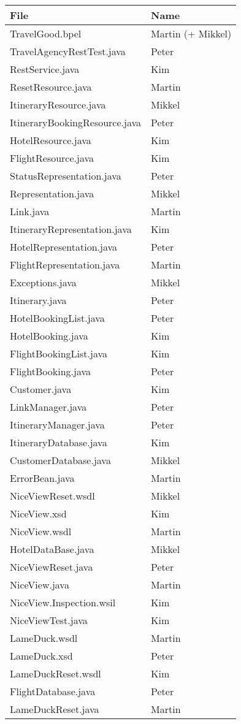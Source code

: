 \begin{tabular}{|l|l|}
\hline \textbf{File} & \textbf{Name} \\ 
\hline TravelGood.bpel & Martin (+ Mikkel) \\ 
\hline TravelAgencyRestTest.java & Peter  \\ 
\hline RestService.java & Kim \\ 
\hline ResetResource.java & Martin \\ 
\hline ItineraryResource.java & Mikkel \\ 
\hline ItineraryBookingResource.java & Peter  \\ 
\hline HotelResource.java & Kim \\ 
\hline FlightResource.java & Kim \\ 
\hline StatusRepresentation.java & Peter \\ 
\hline Representation.java & Mikkel \\ 
\hline Link.java & Martin \\ 
\hline ItineraryRepresentation.java & Kim \\ 
\hline HotelRepresentation.java & Peter \\ 
\hline FlightRepresentation.java & Martin \\ 
\hline Exceptions.java & Mikkel \\ 
\hline Itinerary.java & Peter \\ 
\hline HotelBookingList.java & Peter  \\ 
\hline HotelBooking.java & Kim  \\ 
\hline FlightBookingList.java & Kim  \\ 
\hline FlightBooking.java & Peter \\ 
\hline Customer.java & Kim \\ 
\hline LinkManager.java & Peter \\ 
\hline ItineraryManager.java & Peter \\ 
\hline ItineraryDatabase.java & Kim \\ 
\hline CustomerDatabase.java & Mikkel \\ 
\hline ErrorBean.java & Martin \\ 
\hline NiceViewReset.wsdl & Mikkel \\ 
\hline NiceView.xsd & Kim \\ 
\hline NiceView.wsdl & Martin \\ 
\hline HotelDataBase.java & Mikkel \\ 
\hline NiceViewReset.java & Peter  \\ 
\hline NiceView.java & Martin \\
\hline NiceView.Inspection.wsil & Kim \\ 
\hline NiceViewTest.java & Kim \\ 
\hline LameDuck.wsdl & Martin  \\ 
\hline LameDuck.xsd & Peter \\ 
\hline LameDuckReset.wsdl & Kim \\ 
\hline FlightDatabase.java & Peter  \\ 
\hline LameDuckReset.java & Martin \\
\hline
\end{tabular}

